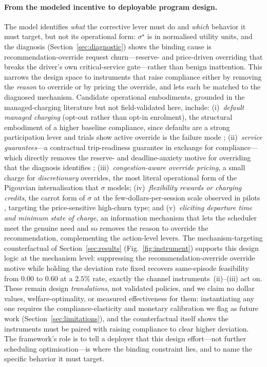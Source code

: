 \documentclass[12pt]{article}
\newcommand{\figref}[1]{Fig.~\ref{#1}}
\begin{document}
\paragraph{From the modeled incentive to deployable program design.} The model identifies \emph{what} the corrective lever must do and \emph{which} behavior it must target, but not its operational form: $\sigma^\star$ is in normalised utility units, and the diagnosis (Section~\ref{sec:diagnostic}) shows the binding cause is recommendation-override request churn---reserve- and price-driven overriding that breaks the driver's own critical-service gate---rather than benign inattention. This narrows the design space to instruments that raise compliance either by removing the \emph{reason} to override or by pricing the override, and lets each be matched to the diagnosed mechanism. Candidate operational embodiments, grounded in the managed-charging literature but not field-validated here, include: (i)~\emph{default managed charging} (opt-out rather than opt-in enrolment), the structural embodiment of a higher baseline compliance, since defaults are a strong participation lever and trials show active override is the failure mode \cite{dudek2021electricnation,alexeenko2023pilot}; (ii)~\emph{service guarantees}---a contractual trip-readiness guarantee in exchange for compliance---which directly removes the reserve- and deadline-anxiety motive for overriding that the diagnosis identifies \cite{schmalfuss2015,hardman2018}; (iii)~\emph{congestion-aware override pricing}, a small charge for \emph{discretionary} overrides, the most literal operational form of the Pigouvian internalisation that $\sigma$ models; (iv)~\emph{flexibility rewards or charging credits}, the carrot form of $\sigma$ at the few-dollars-per-session scale observed in pilots \cite{bailey2025fieldexp,wong2023incentives}, targeting the price-sensitive high-churn type; and (v)~\emph{eliciting departure time and minimum state of charge}, an information mechanism that lets the scheduler meet the genuine need and so removes the reason to override the recommendation, complementing the action-level levers. The mechanism-targeting counterfactual of Section~\ref{sec:results} (\figref{fig:instrument}) supports this design logic at the mechanism level: suppressing the recommendation-override override motive while holding the deviation rate fixed recovers same-episode feasibility from $0.00$ to $0.60$ at a $2.5\%$ rate, exactly the channel instruments~(ii)--(iii) act on. These remain design \emph{translations}, not validated policies, and we claim no dollar values, welfare-optimality, or measured effectiveness for them: instantiating any one requires the compliance-elasticity and monetary calibration we flag as future work (Section~\ref{sec:limitations}), and the counterfactual itself shows the instruments must be paired with raising compliance to clear higher deviation. The framework's role is to tell a deployer that this design effort---not further scheduling optimisation---is where the binding constraint lies, and to name the specific behavior it must target.
\end{document}
